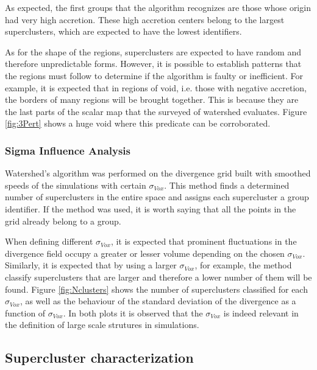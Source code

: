\documentclass[usenatbib]{mnras}
\begin{document}
 As expected, the first groups that the algorithm recognizes are those whose origin had very high accretion. These high accretion centers belong to the largest superclusters, which are expected to have the lowest identifiers.


As for the shape of the regions, superclusters are expected to have
random and therefore unpredictable forms. However, it is possible to
establish patterns that the regions must follow to determine if the
algorithm is faulty or inefficient. For example, it is expected that
in regions of void, i.e. those with negative accretion, the borders of
many regions will be brought together. This is because they are the
last parts of the scalar map that the surveyed of watershed
evaluates. Figure \ref{fig:3Pert} shows a huge void where this
predicate can be corroborated. 


\subsubsection{Sigma Influence Analysis}
\label{sec:Sigmainfluence}
Watershed's algorithm was performed on the divergence grid built with smoothed speeds of the simulations with certain  $\sigma_{Vox}$. This method finds a determined number of superclusters in the entire space and assigns each supercluster a group identifier. If the method was used, it is worth saying that all the points in the grid already belong to a group.


When defining different $\sigma_{Vox}$, it is expected that prominent fluctuations in the divergence field occupy a greater or lesser volume depending on the chosen $\sigma_{Vox}$. Similarly, it is expected that by using a larger $\sigma_{Vox}$, for example, the method classify superclusters that are larger and therefore a lower number of them will be found. Figure \ref{fig:Nclusters} shows the number of superclusters classified for each $\sigma_{Vox}$, as  well as the behaviour of the standard deviation of the divergence as a function of $\sigma_{Vox}$. In both plots it is observed that the $\sigma_{Vox}$ is indeed relevant in the definition of large scale strutures in simulations.


\subsection{Supercluster characterization}
\end{document}
